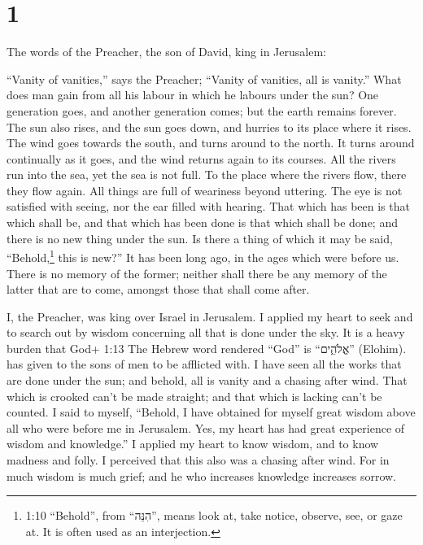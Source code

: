 \hypertarget{section}{%
\section{1}\label{section}}

 The words of the Preacher, the son of David, king in
Jerusalem:

 ``Vanity of vanities,'' says the Preacher; ``Vanity of
vanities, all is vanity.''  What does man gain from all his
labour in which he labours under the sun?  One generation
goes, and another generation comes; but the earth remains forever.
 The sun also rises, and the sun goes down, and hurries to
its place where it rises.  The wind goes towards the south,
and turns around to the north. It turns around continually as it goes,
and the wind returns again to its courses.  All the rivers
run into the sea, yet the sea is not full. To the place where the rivers
flow, there they flow again.  All things are full of
weariness beyond uttering. The eye is not satisfied with seeing, nor the
ear filled with hearing.  That which has been is that which
shall be, and that which has been done is that which shall be done; and
there is no new thing under the sun.  Is there a thing of
which it may be said, ``Behold,\footnote{1:10 ``Behold'', from
  ``הִנֵּה'', means look at, take notice, observe, see, or gaze at. It
  is often used as an interjection.} this is new?'' It has been long
ago, in the ages which were before us.  There is no memory
of the former; neither shall there be any memory of the latter that are
to come, amongst those that shall come after.

 I, the Preacher, was king over Israel in Jerusalem.
 I applied my heart to seek and to search out by wisdom
concerning all that is done under the sky. It is a heavy burden that
God+ 1:13 The Hebrew word rendered ``God'' is ``אֱלֹהִ֑ים'' (Elohim).
has given to the sons of men to be afflicted with.  I have
seen all the works that are done under the sun; and behold, all is
vanity and a chasing after wind.  That which is crooked
can't be made straight; and that which is lacking can't be counted.
 I said to myself, ``Behold, I have obtained for myself
great wisdom above all who were before me in Jerusalem. Yes, my heart
has had great experience of wisdom and knowledge.''  I
applied my heart to know wisdom, and to know madness and folly. I
perceived that this also was a chasing after wind.  For in
much wisdom is much grief; and he who increases knowledge increases
sorrow.

